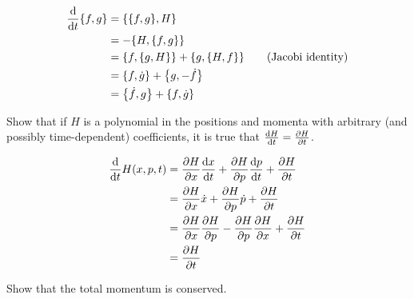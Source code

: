 \documentclass[boxes]{homework}
\makeatletter
\numberwithin{@problem}{section}
\makeatother
\begin{document}
\begin{solution}
	\begin{align*}
		\dv{t}\pb{f}{g} & = \pb{\pb{f}{g}}{H}                                           \\
		                & = -\pb{H}{\pb{f}{g}}                                          \\
		                & = \pb{f}{\pb{g}{H}} + \pb{g}{\pb{H}{f}} \tag{Jacobi identity} \\
		                & = \pb{f}{\dot{g}} + \pb{g}{-\dot{f}}                          \\
		                & = \pb{\dot{f}}{g} + \pb{f}{\dot{g}}
	\end{align*}
\end{solution}

\begin{problem}
Show that if $H$ is a polynomial in the positions and momenta with arbitrary (and possibly time-dependent) coefficients, it is true that $\dv{H}{t} = \pdv{H}{t}$.
\end{problem}

\begin{solution}
	\begin{align*}
		\dv{t}H(x, p, t) & = \pdv{H}{x}\dv{x}{t} + \pdv{H}{p}\dv{p}{t} + \pdv{H}{t}   \\
		                 & = \pdv{H}{x}\dot{x} + \pdv{H}{p}\dot{p} + \pdv{H}{t}       \\
		                 & = \pdv{H}{x}\pdv{H}{p} - \pdv{H}{p}\pdv{H}{x} + \pdv{H}{t} \\
		                 & = \pdv{H}{t}
	\end{align*}
\end{solution}

\begin{problem}
Show that the total momentum is conserved.
\end{problem}
\end{document}
